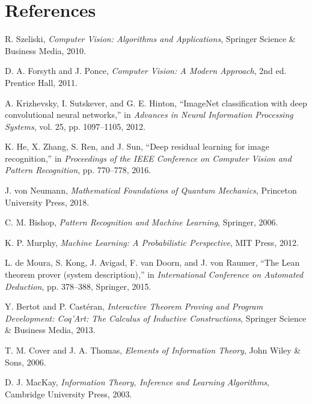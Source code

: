 \documentclass[11pt,a4paper]{article}
\begin{document}
\section{References}
\label{sec:references}

\begin{thebibliography}{99}

R. Szeliski, \textit{Computer Vision: Algorithms and Applications}, Springer Science \& Business Media, 2010.

D. A. Forsyth and J. Ponce, \textit{Computer Vision: A Modern Approach}, 2nd ed. Prentice Hall, 2011.

A. Krizhevsky, I. Sutskever, and G. E. Hinton, ``ImageNet classification with deep convolutional neural networks,'' in \textit{Advances in Neural Information Processing Systems}, vol. 25, pp. 1097--1105, 2012.

K. He, X. Zhang, S. Ren, and J. Sun, ``Deep residual learning for image recognition,'' in \textit{Proceedings of the IEEE Conference on Computer Vision and Pattern Recognition}, pp. 770--778, 2016.

J. von Neumann, \textit{Mathematical Foundations of Quantum Mechanics}, Princeton University Press, 2018.

C. M. Bishop, \textit{Pattern Recognition and Machine Learning}, Springer, 2006.

K. P. Murphy, \textit{Machine Learning: A Probabilistic Perspective}, MIT Press, 2012.

L. de Moura, S. Kong, J. Avigad, F. van Doorn, and J. von Raumer, ``The Lean theorem prover (system description),'' in \textit{International Conference on Automated Deduction}, pp. 378--388, Springer, 2015.

Y. Bertot and P. Castéran, \textit{Interactive Theorem Proving and Program Development: Coq'Art: The Calculus of Inductive Constructions}, Springer Science \& Business Media, 2013.

T. M. Cover and J. A. Thomas, \textit{Elements of Information Theory}, John Wiley \& Sons, 2006.

D. J. MacKay, \textit{Information Theory, Inference and Learning Algorithms}, Cambridge University Press, 2003.


\end{thebibliography}
\end{document}
